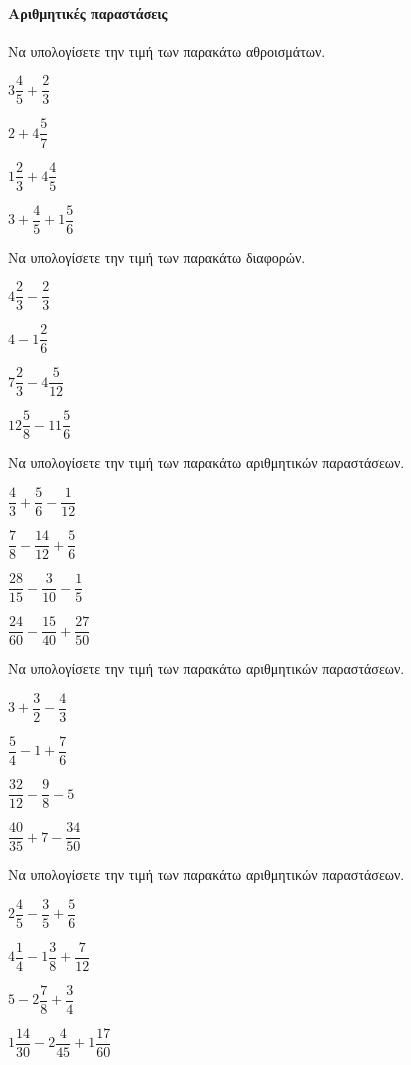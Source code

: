 \documentclass[11pt,a4paper,modern]{FFExercises}
\begin{document}
\paragraph{Αριθμητικές παραστάσεις}
\askhsh
Να υπολογίσετε την τιμή των παρακάτω αθροισμάτων.
\begin{multicols}{2}
\begin{alist}
\item $ 3\dfrac{4}{5}+\dfrac{2}{3} $
\item $ 2+4\dfrac{5}{7} $
\item $ 1\dfrac{2}{3}+4\dfrac{4}{5} $
\item $ 3+\dfrac{4}{5}+1\dfrac{5}{6} $
\end{alist}
\end{multicols}
\askhsh
Να υπολογίσετε την τιμή των παρακάτω διαφορών.
\begin{multicols}{2}
\begin{alist}
\item $ 4\dfrac{2}{3}-\dfrac{2}{3} $
\item $ 4-1\dfrac{2}{6} $
\item $ 7\dfrac{2}{3}-4\dfrac{5}{12} $
\item $ 12\dfrac{5}{8}-11\dfrac{5}{6} $
\end{alist}
\end{multicols}
\askhsh
Να υπολογίσετε την τιμή των παρακάτω αριθμητικών παραστάσεων.
\begin{multicols}{2}
\begin{alist}
\item $ \dfrac{4}{3}+\dfrac{5}{6}-\dfrac{1}{12} $
\item $ \dfrac{7}{8}-\dfrac{14}{12}+\dfrac{5}{6} $
\item $ \dfrac{28}{15}-\dfrac{3}{10}-\dfrac{1}{5} $
\item $ \dfrac{24}{60}-\dfrac{15}{40}+\dfrac{27}{50} $
\end{alist}
\end{multicols}
\askhsh
Να υπολογίσετε την τιμή των παρακάτω αριθμητικών παραστάσεων.
\begin{multicols}{2}
\begin{alist}
\item $ 3+\dfrac{3}{2}-\dfrac{4}{3} $
\item $ \dfrac{5}{4}-1+\dfrac{7}{6} $
\item $ \dfrac{32}{12}-\dfrac{9}{8}-5 $
\item $ \dfrac{40}{35}+7-\dfrac{34}{50} $
\end{alist}
\end{multicols}
\askhsh
Να υπολογίσετε την τιμή των παρακάτω αριθμητικών παραστάσεων.
\begin{multicols}{2}
\begin{alist}
\item $ 2\dfrac{4}{5}-\dfrac{3}{5}+\dfrac{5}{6} $
\item $ 4\dfrac{1}{4}-1\dfrac{3}{8}+\dfrac{7}{12} $
\item $ 5-2\dfrac{7}{8}+\dfrac{3}{4} $
\item $ 1\dfrac{14}{30}-2\dfrac{4}{45}+1\dfrac{17}{60} $
\end{alist}
\end{multicols}
\end{document}

